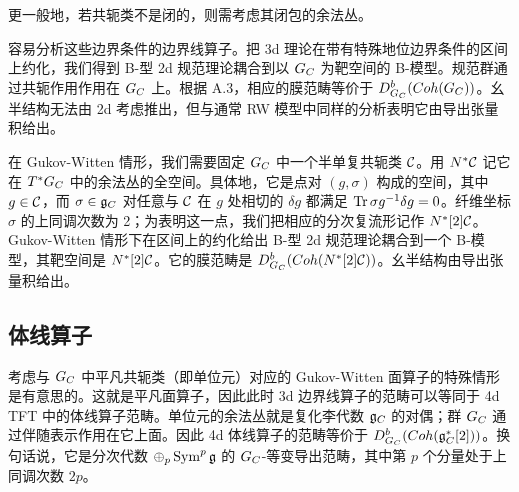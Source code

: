 更一般地，若共轭类不是闭的，则需考虑其闭包的余法丛。

容易分析这些边界条件的边界线算子。把 3d 理论在带有特殊地位边界条件的区间上约化，我们得到 B-型 2d 规范理论耦合到以 $G_C$ 为靶空间的 B-模型。规范群通过共轭作用作用在 $G_C$ 上。根据 A.3，相应的膜范畴等价于 $D^b_{G_C}(Coh(G_C))$。幺半结构无法由 2d 考虑推出，但与通常 RW 模型中同样的分析表明它由导出张量积给出。


在 Gukov-Witten 情形，我们需要固定 $G_C$ 中一个半单复共轭类 $\mathcal{C}$。用 $N^*\mathcal{C}$ 记它在 $T^*G_C$ 中的余法丛的全空间。具体地，它是点对 $(g,\sigma)$ 构成的空间，其中 $g\in\mathcal{C}$，而 $\sigma\in\mathfrak{g}_C$ 对任意与 $\mathcal{C}$ 在 $g$ 处相切的 $\delta g$ 都满足 $\operatorname{Tr}\sigma g^{-1}\delta g=0$。纤维坐标 $\sigma$ 的上同调次数为 2；为表明这一点，我们把相应的分次复流形记作 $N^*[2]\mathcal{C}$。Gukov-Witten 情形下在区间上的约化给出 B-型 2d 规范理论耦合到一个 B-模型，其靶空间是 $N^*[2]\mathcal{C}$。它的膜范畴是 $D^b_{G_C}(Coh(N^*[2]\mathcal{C}))$。幺半结构由导出张量积给出。


\subsection{体线算子}

考虑与 $G_C$ 中平凡共轭类（即单位元）对应的 Gukov-Witten 面算子的特殊情形是有意思的。这就是平凡面算子，因此此时 3d 边界线算子的范畴可以等同于 4d TFT 中的体线算子范畴。单位元的余法丛就是复化李代数 $\mathfrak{g}_C$ 的对偶；群 $G_C$ 通过伴随表示作用在它上面。因此 4d 体线算子的范畴等价于 $D^b_{G_C}(Coh(\mathfrak{g}^*_C[2]))$。换句话说，它是分次代数 $\oplus_p\operatorname{Sym}^p\mathfrak{g}$ 的 $G_C$-等变导出范畴，其中第 $p$ 个分量处于上同调次数 $2p$。



